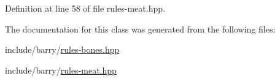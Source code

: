 Definition at line 58 of file rules-\/meat.\+hpp.



The documentation for this class was generated from the following files\+:\begin{DoxyCompactItemize}
\item 
include/barry/\hyperlink{rules-bones_8hpp}{rules-\/bones.\+hpp}\item 
include/barry/\hyperlink{rules-meat_8hpp}{rules-\/meat.\+hpp}\end{DoxyCompactItemize}
